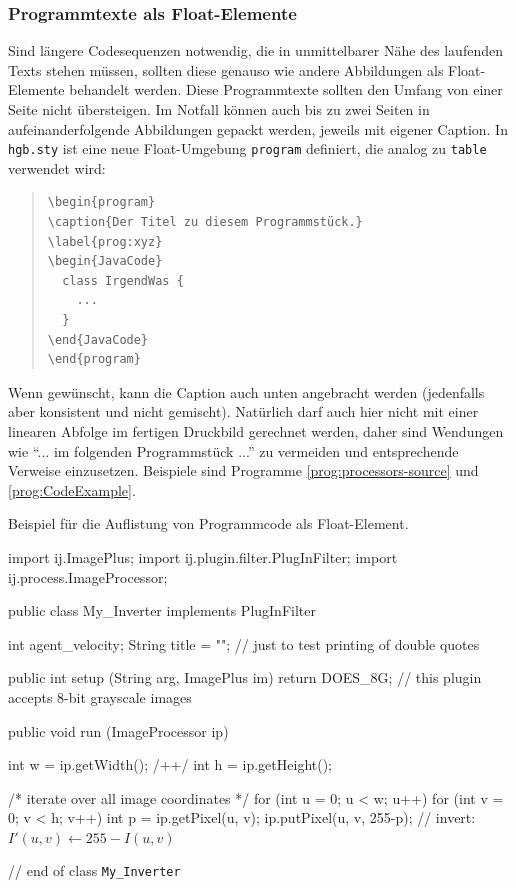 \subsubsection{Programmtexte als Float-Elemente}
Sind längere Codesequenzen notwendig, die in unmittelbarer Nähe des laufenden Texts
stehen müssen, sollten diese genauso wie andere Abbildungen als Float-Elemente
behandelt werden. Diese Programmtexte sollten den Umfang von einer Seite nicht übersteigen.
Im Notfall können auch bis zu zwei Seiten in aufeinanderfolgende Abbildungen gepackt werden,
jeweils mit eigener Caption. In \texttt{hgb.sty} ist eine neue Float-Umgebung \texttt{program} definiert, die analog zu \texttt{table} verwendet wird:
%
\begin{quote}
\begin{verbatim}
\begin{program}
\caption{Der Titel zu diesem Programmstück.}
\label{prog:xyz}
\begin{JavaCode}
  class IrgendWas {
    ...
  }
\end{JavaCode}
\end{program}
\end{verbatim}
\end{quote}
%
Wenn gewünscht, kann die Caption auch unten angebracht werden 
(jedenfalls aber konsistent und nicht gemischt).
Natürlich darf auch hier nicht mit einer linearen Abfolge im fertigen
Druckbild gerechnet werden, daher sind Wendungen wie
"`... im  folgenden Programmstück ..."' zu vermeiden und entsprechende Verweise
einzusetzen. Beispiele sind Programme \ref{prog:processors-source} und \ref{prog:CodeExample}.

\begin{program}
\caption{Beispiel für die Auflistung von Programmcode als Float-Element.}
\label{prog:CodeExample}
\begin{JavaCode}
import ij.ImagePlus;
import ij.plugin.filter.PlugInFilter;
import ij.process.ImageProcessor;

public class My_Inverter implements PlugInFilter {
	int agent_velocity;
  String title = ""; // just to test printing of double quotes

	public int setup (String arg, ImagePlus im) {
		return DOES_8G;	// this plugin accepts 8-bit grayscale images \label{pr:IjSamplePlugin10}
	}

	public void run (ImageProcessor ip) {
		int w = ip.getWidth();	/+\label{ExampleCodeLabel}+/
		int h = ip.getHeight(); 
		
		/* iterate over all image coordinates */
		for (int u = 0; u < w; u++) { 
			for (int v = 0; v < h; v++) {
				int p = ip.getPixel(u, v); 
				ip.putPixel(u, v, 255-p); // invert: $I'(u,v) \leftarrow 255 - I(u,v)$\label{MathInCode}
			}
		}
	}		
} // end of class {\tt My\_Inverter}
\end{JavaCode}
%
\end{program}


